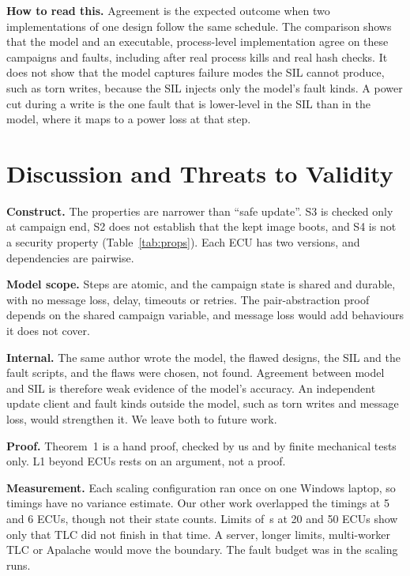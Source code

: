 \documentclass[journal]{IEEEtran}
\begin{document}
\textbf{How to read this.} Agreement is the expected outcome when two implementations of one design follow the same schedule. The comparison shows that the model and an executable, process-level implementation agree on these campaigns and faults, including after real process kills and real hash checks. It does not show that the model captures failure modes the SIL cannot produce, such as torn writes, because the SIL injects only the model's fault kinds. A power cut during a write is the one fault that is lower-level in the SIL than in the model, where it maps to a power loss at that step.

\section{Discussion and Threats to Validity}
\label{sec:threats}

\textbf{Construct.} The properties are narrower than ``safe update''. S3 is checked only at campaign end, S2 does not establish that the kept image boots, and S4 is not a security property (Table~\ref{tab:props}). Each ECU has two versions, and dependencies are pairwise.

\textbf{Model scope.} Steps are atomic, and the campaign state is shared and durable, with no message loss, delay, timeouts or retries. The pair-abstraction proof depends on the shared campaign variable, and message loss would add behaviours it does not cover.

\textbf{Internal.} The same author wrote the model, the flawed designs, the SIL and the fault scripts, and the flaws were chosen, not found. Agreement between model and SIL is therefore weak evidence of the model's accuracy. An independent update client and fault kinds outside the model, such as torn writes and message loss, would strengthen it. We leave both to future work.

\textbf{Proof.} Theorem~1 is a hand proof, checked by us and by finite mechanical tests only. L1 beyond \LiveMax{} ECUs rests on an argument, not a proof.

\textbf{Measurement.} Each scaling configuration ran once on one Windows laptop, so timings have no variance estimate. Our other work overlapped the timings at 5 and 6 ECUs, though not their state counts. Limits of \ScaleShortLimit\,s at 20 and 50 ECUs show only that TLC did not finish in that time. A server, longer limits, multi-worker TLC or Apalache \cite{konnov2019} would move the boundary. The fault budget was \ScaleFaultBudget{} in the scaling runs.
\end{document}
